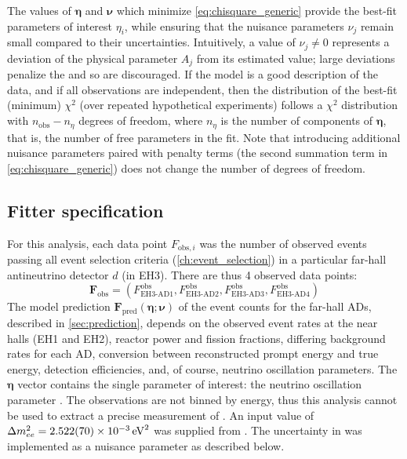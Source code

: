 The values of $\boldsymbol{\eta}$ and $\boldsymbol{\nu}$
which minimize \cref{eq:chisquare_generic}
provide the best-fit parameters of interest $\eta_i$,
while ensuring that the nuisance parameters $\nu_j$
remain small compared to their uncertainties.
Intuitively, a value of $\nu_j \neq 0$ represents
a deviation of the physical parameter $A_j$ from its estimated value;
large deviations penalize the \chisquare{} and so are discouraged.
If the model is a good description of the data,
and if all observations are independent,
then the distribution of the best-fit (minimum) $\chi^2$
(over repeated hypothetical experiments)
follows a $\chi^2$ distribution with $n_\text{obs} - n_\eta$ degrees of freedom,
where $n_\eta$ is the number of components of $\boldsymbol{\eta}$,
that is, the number of free parameters in the fit.
Note that introducing additional nuisance parameters
paired with penalty terms (the second summation term in \cref{eq:chisquare_generic})
does not change the number of degrees of freedom.

\subsection{Fitter specification}
\label{subsec:fitter_specification}

For this analysis, each data point $F_{\text{obs},i}$
was the number of observed events passing all event selection criteria
(\cref{ch:event_selection})
in a particular far-hall antineutrino detector $d$ (in EH3).
There are thus 4 observed data points:
\begin{equation}
    \mathbf{F}_{\text{obs}} =
    (F^{\text{obs}}_{\text{EH3-AD1}},
    F^{\text{obs}}_{\text{EH3-AD2}},
    F^{\text{obs}}_{\text{EH3-AD3}},
    F^{\text{obs}}_{\text{EH3-AD4}})
\end{equation}
The model prediction
$\mathbf{F}_{\text{pred}}(\boldsymbol{\eta};\boldsymbol{\nu})$
of the event counts for the far-hall ADs,
described in \cref{sec:prediction},
depends on the observed event rates at the near halls (EH1 and EH2),
reactor power and fission fractions,
differing background rates for each AD,
conversion between reconstructed prompt energy and true \nuebar{} energy,
detection efficiencies,
and, of course, neutrino oscillation parameters.
The $\boldsymbol{\eta}$ vector contains the single parameter of interest:
the neutrino oscillation parameter \thetaot{}.
The observations are not binned by energy,
thus this analysis cannot be used to extract
a precise measurement of \dmee{}.
An input value of $\dmee = \SI{2.522(70)e-3}{\eV\squared}$
was supplied from \cite{ngd2018}.
The uncertainty in \dmee{} was implemented
as a nuisance parameter as described below.


